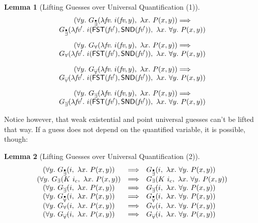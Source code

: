\documentclass[a4paper,12pt,DIV=12,oneside]{scrbook}
\newcommand{\fv}{\textit{fv}}
\newtheorem{lemma}{Lemma}[section]
\theoremstyle{definition}
\theoremstyle{remark}
\newcommand{\GE}{\ensuremath{G_\exists}}
\newcommand{\GEP}{\ensuremath{G_{\accentset{\bullet}{\exists}}}}
\newcommand{\GEG}{\ensuremath{G_{\accentset{\_\,\_}{\exists}}}}
\newcommand{\GU}{\ensuremath{G_\forall}}
\newcommand{\GUP}{\ensuremath{G_{\accentset{\bullet}{\forall}}}}
\newcommand{\GUG}{\ensuremath{G_{\accentset{\_\,\_}{\forall}}}}
\begin{document}
\begin{lemma}[Lifting Guesses over Universal Quantification (1)]\label{lemma_guesses_lift_forall_1}
\[
\begin{array}{c}
(\forall y.\ \GEP(\lambda \fv.\ i(\fv, y),\ \lambda x.\ P(x, y)) \Longrightarrow \\
\GEP(\lambda \fv'.\ i(\textsf{FST}(\fv'), \textsf{SND}(\fv')),\ \lambda x.\ \forall y.\ P(x, y)) \\[1em]

(\forall y.\ \GU(\lambda \fv.\ i(\fv, y),\ \lambda x.\ P(x, y)) \Longrightarrow \\
\GU(\lambda \fv'.\ i(\textsf{FST}(\fv'), \textsf{SND}(\fv')),\ \lambda x.\ \forall y.\ P(x, y)) \\[1em]

(\forall y.\ \GUG(\lambda \fv.\ i(\fv, y),\ \lambda x.\ P(x, y)) \Longrightarrow \\
\GUG(\lambda \fv'.\ i(\textsf{FST}(\fv'), \textsf{SND}(\fv')),\ \lambda x.\ \forall y.\ P(x, y)) \\[1em]

(\forall y.\ \GEG(\lambda \fv.\ i(\fv, y),\ \lambda x.\ P(x, y)) \Longrightarrow \\
\GEG(\lambda \fv'.\ i(\textsf{FST}(\fv'), \textsf{SND}(\fv')),\ \lambda x.\ \forall y.\ P(x, y)) \\
\end{array}
\]
\end{lemma}
%
Notice however, that weak existential and point universal guesses can't be lifted that way. If a guess does not depend on the quantified variable,
it is possible, though:

\begin{lemma}[Lifting Guesses over Universal Quantification (2)]\label{lemma_guesses_lift_forall_2}
\[
\begin{array}{c@{\quad}c@{\quad}l}
(\forall y.\ \GEP(i,\ \lambda x.\ P(x, y)) & \Longrightarrow & \GEP(i,\ \lambda x.\ \forall y.\ P(x, y)) \\
(\forall y.\ \GE(K\ i_c,\ \lambda x.\ P(x, y)) & \Longrightarrow & \GE(K\ i_c,\ \lambda x.\ \forall y.\ P(x, y)) \\
(\forall y.\ \GEG(i,\ \lambda x.\ P(x, y)) & \Longrightarrow & \GEG(i,\ \lambda x.\ \forall y.\ P(x, y)) \\
(\forall y.\ \GUP(i,\ \lambda x.\ P(x, y)) & \Longrightarrow & \GUP(i,\ \lambda x.\ \forall y.\ P(x, y)) \\
(\forall y.\ \GU(i,\ \lambda x.\ P(x, y)) & \Longrightarrow & \GU(i,\ \lambda x.\ \forall y.\ P(x, y)) \\
(\forall y.\ \GUG(i,\ \lambda x.\ P(x, y)) & \Longrightarrow & \GUG(i,\ \lambda x.\ \forall y.\ P(x, y)) 
\end{array}
\]
\end{lemma}
\end{document}
